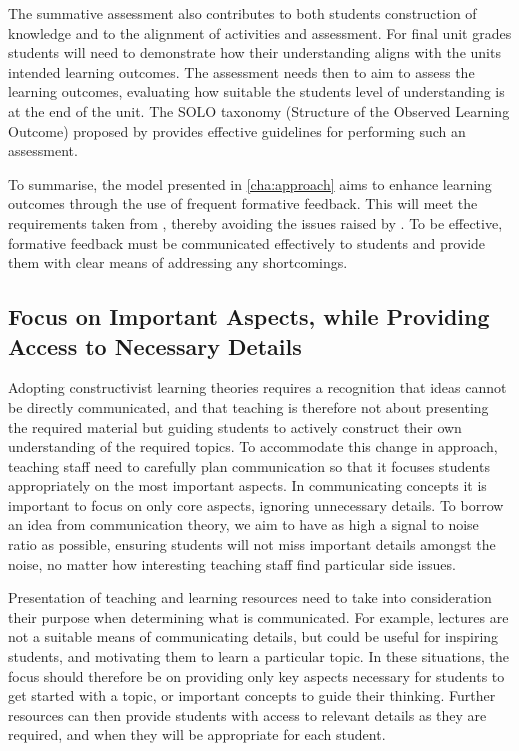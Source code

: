 The summative assessment also contributes to both students construction of knowledge and to the alignment of activities and assessment. For final unit grades students will need to demonstrate how their understanding aligns with the units intended learning outcomes. The assessment needs then to aim to assess the learning outcomes, evaluating how suitable the students level of understanding is at the end of the unit. The SOLO taxonomy (Structure of the Observed Learning Outcome) proposed by \citet{Biggs:1982} provides effective guidelines for performing such an assessment.

To summarise, the model presented in \cref{cha:approach} aims to enhance learning outcomes through the use of frequent formative feedback. This will meet the requirements taken from \citet{Gibbs:2004}, thereby avoiding the issues raised by \citet{Smith:2005}. To be effective, formative feedback must be communicated effectively to students and provide them with clear means of addressing any shortcomings.


\subsection{Focus on Important Aspects, while Providing Access to Necessary Details} %
\label{ssub:focus_on_important_aspects}

Adopting constructivist learning theories requires a recognition that ideas cannot be directly communicated, and that teaching is therefore not about presenting the required material but guiding students to actively construct their own understanding of the required topics. To accommodate this change in approach, teaching staff need to carefully plan communication so that it focuses students appropriately on the most important aspects. In communicating concepts it is important to focus on only core aspects, ignoring unnecessary details. To borrow an idea from communication theory, we aim to have as high a signal to noise ratio \cite{Shannon:1949} as possible, ensuring students will not miss important details amongst the noise, no matter how interesting teaching staff find particular side issues.

Presentation of teaching and learning resources need to take into consideration their purpose when determining what is communicated. For example, lectures are not a suitable means of communicating details, but could be useful for inspiring students, and motivating them to learn a particular topic. In these situations, the focus should therefore be on providing only key aspects necessary for students to get started with a topic, or important concepts to guide their thinking. Further resources can then provide students with access to relevant details as they are required, and when they will be appropriate for each student.

